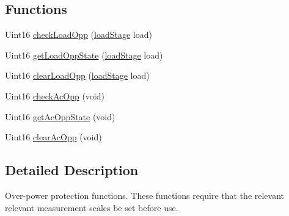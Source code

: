 \subsection*{Functions}
\begin{DoxyCompactItemize}
\item 
Uint16 \hyperlink{a00032_ad66082246819b4aa7758cb791de55ca2}{check\-Load\-Opp} (\hyperlink{a00027_a2820f1e18d921d2f1e97d53404b9fbae}{load\-Stage} load)
\item 
Uint16 \hyperlink{a00032_afc7fb5a768a0ddaf7e99dd65eb84a3b0}{get\-Load\-Opp\-State} (\hyperlink{a00027_a2820f1e18d921d2f1e97d53404b9fbae}{load\-Stage} load)
\item 
Uint16 \hyperlink{a00032_a16c41a7ea9c7037ab8721ea914269e71}{clear\-Load\-Opp} (\hyperlink{a00027_a2820f1e18d921d2f1e97d53404b9fbae}{load\-Stage} load)
\item 
Uint16 \hyperlink{a00032_aaaf0cea838afd7187715dc2a84e644f3}{check\-Ac\-Opp} (void)
\item 
Uint16 \hyperlink{a00032_a6b586bb208ca60bcbfc630685df47bf0}{get\-Ac\-Opp\-State} (void)
\item 
Uint16 \hyperlink{a00032_af4e230aa537a2cc7cb6daa364fabaca9}{clear\-Ac\-Opp} (void)
\end{DoxyCompactItemize}


\subsection{Detailed Description}
Over-\/power protection functions. These functions require that the relevant relevant measurement scales be set before use. 

